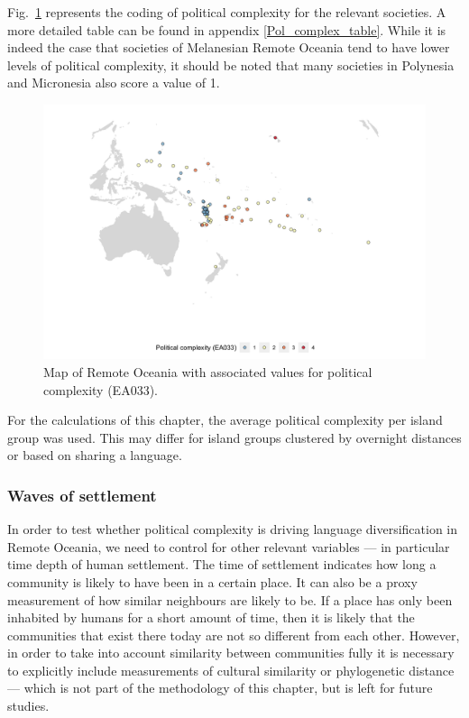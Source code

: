 \documentclass[a4paper,10pt]{article} %
\begin{document}
Fig.~\ref{pol_complex_map} represents the coding of political complexity for the relevant societies. A more detailed table can be found in appendix \ref{Pol_complex_table}. While it is indeed the case that societies of Melanesian Remote Oceania tend to have lower levels of political complexity, it should be noted that many societies in Polynesia and Micronesia also score a value of 1.

\begin{figure}
\centering
\includegraphics[width=19cm]{illustrations/plots_from_R/map_pol_complex.png}
\caption[Map of Remote Oceania: Political complexity]{{Map of Remote Oceania with associated values for political complexity (EA033).}}
\label{pol_complex_map}
\end{figure}

For the calculations of this chapter, the average political complexity per island group was used. This may differ for island groups clustered by overnight distances or based on sharing a language.


\subsubsection{Waves of settlement}
\label{pol_complex_sec_dates}
In order to test whether political complexity is driving language diversification in Remote Oceania, we need to control for other relevant variables --- in particular time depth of human settlement. The time of settlement indicates how long a community is likely to have been in a certain place. It can also be a proxy measurement of how similar neighbours are likely to be. If a place has only been inhabited by humans for a short amount of time, then it is likely that the communities that exist there today are not so different from each other. However, in order to take into account similarity between communities fully it is necessary to explicitly include measurements of cultural similarity or phylogenetic distance --- which is not part of the methodology of this chapter, but is left for future studies.
\end{document}
